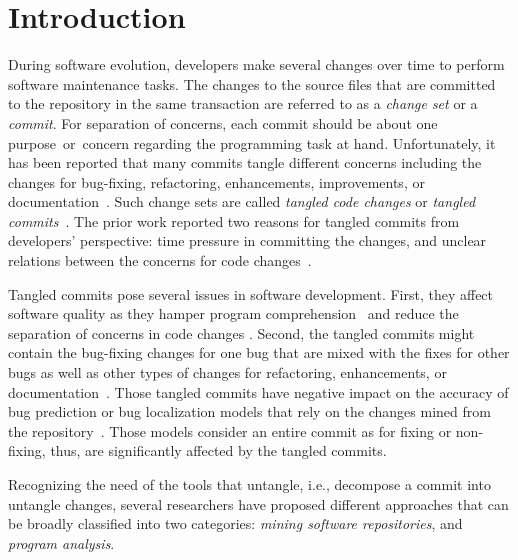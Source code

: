 \section{Introduction}
\label{intro:sec}

During software evolution, developers make several changes over time
to perform software maintenance tasks. The changes to the
source files that are committed to the repository in the same
transaction are referred to as a {\em change set} or a {\em
  commit}. For separation of concerns, each commit should be about one
purpose~or~concern regarding the programming task at hand.
Unfortunately, it has been reported that many commits tangle different
concerns including the changes for bug-fixing, refactoring,
enhancements, improvements, or
documentation~\cite{tao-fse12,kim-emse16,kim-msr13,hill-tse12,nguyen-issre13}.
Such change sets are called {\em tangled code changes} or {\em tangled
  commits}~\cite{kim-emse16,kim-msr13}. The prior work reported two
reasons for tangled commits from developers' perspective: time
pressure in committing the changes, and unclear relations between the
concerns for code changes~\cite{flexeme-fse20}.

Tangled commits pose several issues in software development. First,
they affect software quality as they hamper program
comprehension~\cite{tao-fse12} and reduce the separation of concerns
in code changes \cite{flexeme-fse20}. Second, the tangled commits
might contain the bug-fixing changes for one bug that are mixed with
the fixes for other bugs as well as other types of changes for
refactoring, enhancements, or
documentation~\cite{kim-emse16,kim-msr13,nguyen-issre13}. Those
tangled commits have negative impact on the accuracy of bug
prediction or bug localization models that rely on the changes mined from
the repository~\cite{kim-emse16,kim-msr13}. Those models
consider an entire commit as for fixing or non-fixing, thus, are
significantly affected by the tangled commits.

Recognizing the need of the tools that untangle, i.e., decompose a
commit into untangle changes, several researchers have proposed
different approaches that can be broadly classified into two
categories: {\em mining software repositories}, and {\em program
  analysis}.

